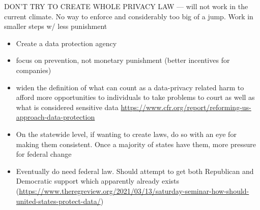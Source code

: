 \documentclass[water,article,submit,moreauthors,pdftex]{mdpi}
\providecommand{\tightlist}{%
  \setlength{\itemsep}{0pt}\setlength{\parskip}{4pt}}
\begin{document}
DON'T TRY TO CREATE WHOLE PRIVACY LAW --- will not work in the current
climate. No way to enforce and considerably too big of a jump. Work in
smaller steps w/ less punishment

\begin{itemize}
\tightlist
\item
  Create a data protection agency
\item
  focus on prevention, not monetary punishment (better incentives for
  companies)
\item
  widen the definition of what can count as a data-privacy related harm
  to afford more opportunities to individuals to take problems to court
  as well as what is considered sensitive data
  \url{https://www.cfr.org/report/reforming-us-approach-data-protection}
\item
  On the statewide level, if wanting to create laws, do so with an eye
  for making them consistent. Once a majority of states have them, more
  pressure for federal change
\item
  Eventually do need federal law. Should attempt to get both Republican
  and Democratic support which apparently already exists
  (\url{https://www.theregreview.org/2021/03/13/saturday-seminar-how-should-united-states-protect-data/})
\end{itemize}

%

\vspace{6pt}




\end{document}
